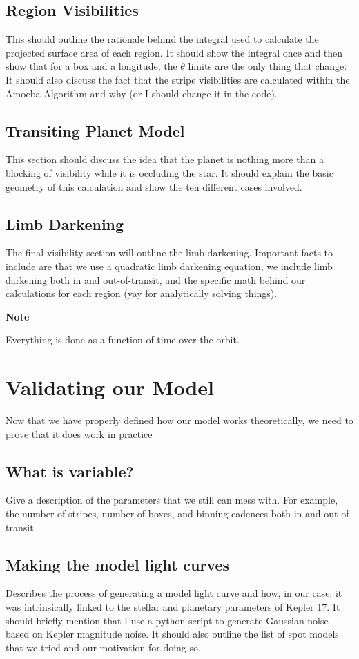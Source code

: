 \documentclass[iop]{emulateapj}
\begin{document}
	
\subsection{Region Visibilities}
	This should outline the rationale behind the integral used to calculate the projected surface area of each region. It should show the integral once and then show that for a box and a longitude, the $\theta$ limits are the only thing that change. It should also discuss the fact that the stripe visibilities are calculated within the Amoeba Algorithm and why (or I should change it in the code).
	
\subsection{Transiting Planet Model}
	This section should discuss the idea that the planet is nothing more than a blocking of visibility while it is occluding the star. It should explain the basic geometry of this calculation and show the ten different cases involved.

\subsection{Limb Darkening}
	The final visibility section will outline the limb darkening. Important facts to include are that we use a quadratic limb darkening equation, we include limb darkening both in and out-of-transit, and the specific math behind our calculations for each region (yay for analytically solving things).

\textbf{Note}

Everything is done as a function of time over the orbit.

\section{Validating our Model}
Now that we have properly defined how our model works theoretically, we need to prove that it does work in practice
\subsection{What is variable?}
	Give a description of the parameters that we still can mess with. For example, the number of stripes, number of boxes,  and binning cadences both in and out-of-transit.
\subsection{Making the model light curves}
	Describes the process of generating a model light curve and how, in our case, it was intrinsically linked to the stellar and planetary parameters of Kepler 17. It should briefly mention that I use a python script to generate Gaussian noise based on Kepler magnitude noise. It should also outline the list of spot models that we tried and our motivation for doing so.
	
\end{document}
